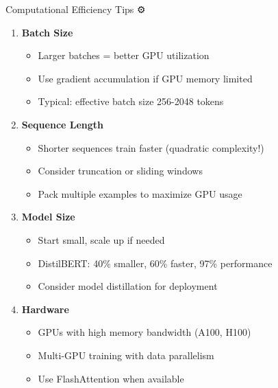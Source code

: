 \documentclass[aspectratio=169]{beamer}
\begin{document}
\begin{frame}[shrink=10]{Computational Efficiency Tips ⚙️}
\begin{enumerate}\setlength{\itemsep}{0pt}
    \item \textbf{Batch Size}
    \begin{itemize}\setlength{\itemsep}{0pt}
        \item Larger batches = better GPU utilization
        \item Use gradient accumulation if GPU memory limited
        \item Typical: effective batch size 256-2048 tokens
    \end{itemize}

    \vspace{0.5em}

    \item \textbf{Sequence Length}
    \begin{itemize}\setlength{\itemsep}{0pt}
        \item Shorter sequences train faster (quadratic complexity!)
        \item Consider truncation or sliding windows
        \item Pack multiple examples to maximize GPU usage
    \end{itemize}

    \vspace{0.5em}

    \item \textbf{Model Size}
    \begin{itemize}\setlength{\itemsep}{0pt}
        \item Start small, scale up if needed
        \item DistilBERT: 40\% smaller, 60\% faster, 97\% performance
        \item Consider model distillation for deployment
    \end{itemize}

    \vspace{0.5em}

    \item \textbf{Hardware}
    \begin{itemize}\setlength{\itemsep}{0pt}
        \item GPUs with high memory bandwidth (A100, H100)
        \item Multi-GPU training with data parallelism
        \item Use FlashAttention when available
    \end{itemize}
\end{enumerate}
\end{frame}
\end{document}
